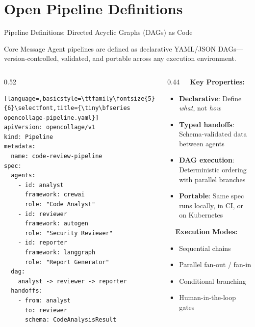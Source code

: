 \section{Open Pipeline Definitions}

\begin{frame}[fragile]{\fontsize{10}{12}\selectfont Pipeline Definitions: Directed Acyclic Graphs (DAGs) as Code}
  \vspace{-0.3cm}
  \begin{block}{Core Message}
    \fontsize{6}{7}\selectfont
    Agent pipelines are defined as declarative YAML/JSON DAGs---version-controlled,
    validated, and portable across any execution environment.
  \end{block}

  \vspace{0.0cm}

  \begin{columns}[T]
    \begin{column}{0.52\textwidth}
      \begin{lstlisting}[language=,basicstyle=\ttfamily\fontsize{5}{6}\selectfont,title={\tiny\bfseries opencollage-pipeline.yaml}]
apiVersion: opencollage/v1
kind: Pipeline
metadata:
  name: code-review-pipeline
spec:
  agents:
    - id: analyst
      framework: crewai
      role: "Code Analyst"
    - id: reviewer
      framework: autogen
      role: "Security Reviewer"
    - id: reporter
      framework: langgraph
      role: "Report Generator"
  dag:
    analyst -> reviewer -> reporter
  handoffs:
    - from: analyst
      to: reviewer
      schema: CodeAnalysisResult
      \end{lstlisting}
    \end{column}
    \begin{column}{0.44\textwidth}
      \fontsize{6}{7}\selectfont
      \textbf{\ \ Key Properties:}
      \begin{itemize}
        \item \textbf{Declarative}: Define \emph{what}, not \emph{how}
        \item \textbf{Typed handoffs}: Schema-validated data between agents
        \item \textbf{DAG execution}: Deterministic ordering with parallel branches
        \item \textbf{Portable}: Same spec runs locally, in CI, or on Kubernetes
      \end{itemize}

      \vspace{0.1cm}

      \textbf{\ \ Execution Modes:}
      \begin{itemize}
        \item Sequential chains
        \item Parallel fan-out / fan-in
        \item Conditional branching
        \item Human-in-the-loop gates
      \end{itemize}
    \end{column}
  \end{columns}
\end{frame}
